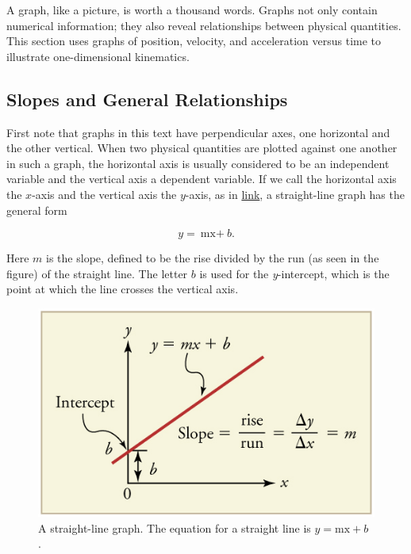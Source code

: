 \documentclass[
]{book}
\begin{document}
A graph, like a picture, is worth a thousand words. Graphs not only
contain numerical information; they also reveal relationships between
physical quantities. This section uses graphs of position, velocity, and
acceleration versus time to illustrate one-dimensional kinematics.

\hypertarget{fs-id1396690}{}
\hypertarget{slopes-and-general-relationships}{%
\subsection{Slopes and General Relationships}\label{slopes-and-general-relationships}}

First note that graphs in this text have perpendicular axes, one
horizontal and the other vertical. When two physical quantities are
plotted against one another in such a graph, the horizontal axis is
usually considered to be an \protect\hypertarget{import-auto-id1690042}{}{independent
variable} and the vertical axis
a \protect\hypertarget{import-auto-id2013112}{}{dependent variable}. If we
call the horizontal axis the \(x{}\)-axis and the vertical axis the
\(y{}\)-axis, as in
\protect\hyperlink{import-auto-id2359358}{link}, a straight-line
graph has the general form

\leavevmode\hypertarget{import-auto-id4175150}{}%
\[{{{y = {\text{mx} +}}b}.}{}\]

Here \(m{}\) is the \protect\hypertarget{import-auto-id1773074}{}{slope},
defined to be the rise divided by the run (as seen in the figure) of the
straight line. The letter \(b{}\) is used for the
\protect\hypertarget{import-auto-id2955215}{}{\emph{y}-intercept}, which is the
point at which the line crosses the vertical axis.

\begin{figure}
\hypertarget{import-auto-id2359358}{%
\centering
\includegraphics{images/Figure_02_07_01.jpg}
\caption{A straight-line graph. The equation for a straight line is
\({y = {\text{mx} + b}}{}\)
.}\label{import-auto-id2359358}
}
\end{figure}
\end{document}
